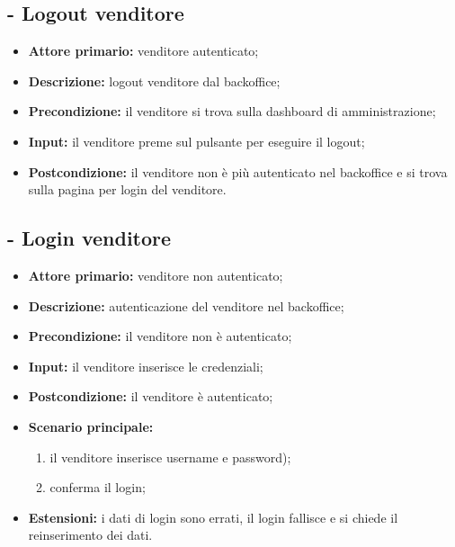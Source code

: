 \stepUserCase
\subsection{ - Logout venditore}
\begin{itemize}
    \item \textbf{Attore primario:} venditore autenticato;
    \item \textbf{Descrizione:} logout venditore dal backoffice;
    \item \textbf{Precondizione:} il venditore si trova sulla dashboard di amministrazione;
    \item \textbf{Input:} il venditore preme sul pulsante per eseguire il logout;
    \item \textbf{Postcondizione:} il venditore non è più autenticato nel backoffice e si trova sulla pagina per login del venditore.
\end{itemize}

\stepUserCase
\subsection{ - Login venditore}
\begin{itemize}
    \item \textbf{Attore primario:} venditore non autenticato;
    \item \textbf{Descrizione:} autenticazione del venditore nel backoffice;
    \item \textbf{Precondizione:} il venditore non è autenticato;
    \item \textbf{Input:} il venditore inserisce le credenziali;
    \item \textbf{Postcondizione:} il venditore è autenticato;
    \item \textbf{Scenario principale:}
          \begin{enumerate}
              \item il venditore inserisce username e password);
              \item conferma il login;
          \end{enumerate}
    \item \textbf{Estensioni:} i dati di login sono errati, il login fallisce e si chiede il reinserimento dei dati.
\end{itemize}